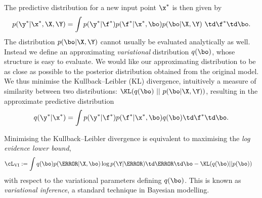 The predictive distribution for a new input point $\x^*$ is then given by 
$$
p(\y^* | \x^*, \X, \Y) = \int p(\y^* | \f^*) p(\f^* | \x^*, \bo) p(\bo | \X, \Y)\ \td \f^* \td \bo.
$$
The distribution $p(\bo | \X, \Y)$ cannot usually be evaluated analytically as well. Instead we define an approximating \textit{variational} distribution $q(\bo)$, whose structure is easy to evaluate.
We would like our approximating distribution to be as close as possible to the posterior distribution obtained from the original model. We thus minimise the Kullback--Leibler (KL) divergence, intuitively a measure of similarity between two distributions: $\KL(q(\bo) ~||~ p(\bo | \X, \Y))$,
resulting in the approximate predictive distribution 
\begin{align} \label{eq:predictive}
q(\y^* | \x^*) = \int p(\y^* | \f^*) p(\f^* | \x^*, \bo) q(\bo) \td \f^* \td \bo.
\end{align}

Minimising the Kullback--Leibler divergence is equivalent to maximising the \textit{log evidence lower bound},
\begin{align}
&\cL_{\text{VI}} := \int q(\bo) p(\F | \X, \bo) \log p(\Y | \F) \td \F \td \bo - \KL(q(\bo) || p(\bo)) \label{eq:L:VI}
\end{align}
with respect to the variational parameters defining $q(\bo)$. This is known as \textit{variational inference}, a standard technique in Bayesian modelling.


